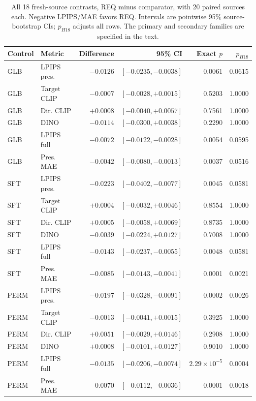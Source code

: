 \begin{table}[t]
\centering\small
\caption{All 18 fresh-source contrasts, REQ minus comparator, with 20 paired sources each. Negative LPIPS/MAE favors REQ. Intervals are pointwise 95\% source-bootstrap CIs; $p_{H18}$ adjusts all rows. The primary and secondary families are specified in the text.}
\label{tab:r87-all18}
\setlength{\tabcolsep}{4pt}
\begin{tabular}{llrrrr}
\toprule
Control & Metric & Difference & 95\% CI & Exact $p$ & $p_{H18}$\\
\midrule
GLB & LPIPS pres. & $-0.0126$ & $[-0.0235,-0.0038]$ & 0.0061 & 0.0615\\
GLB & Target CLIP & $-0.0007$ & $[-0.0028,+0.0015]$ & 0.5203 & 1.0000\\
GLB & Dir. CLIP & $+0.0008$ & $[-0.0040,+0.0057]$ & 0.7561 & 1.0000\\
GLB & DINO & $-0.0114$ & $[-0.0300,+0.0038]$ & 0.2290 & 1.0000\\
GLB & LPIPS full & $-0.0072$ & $[-0.0122,-0.0028]$ & 0.0054 & 0.0595\\
GLB & Pres. MAE & $-0.0042$ & $[-0.0080,-0.0013]$ & 0.0037 & 0.0516\\
\midrule
SFT & LPIPS pres. & $-0.0223$ & $[-0.0402,-0.0077]$ & 0.0045 & 0.0581\\
SFT & Target CLIP & $+0.0004$ & $[-0.0032,+0.0046]$ & 0.8554 & 1.0000\\
SFT & Dir. CLIP & $+0.0005$ & $[-0.0058,+0.0069]$ & 0.8735 & 1.0000\\
SFT & DINO & $-0.0039$ & $[-0.0224,+0.0127]$ & 0.7008 & 1.0000\\
SFT & LPIPS full & $-0.0143$ & $[-0.0237,-0.0055]$ & 0.0048 & 0.0581\\
SFT & Pres. MAE & $-0.0085$ & $[-0.0143,-0.0041]$ & 0.0001 & 0.0021\\
\midrule
PERM & LPIPS pres. & $-0.0197$ & $[-0.0328,-0.0091]$ & 0.0002 & 0.0026\\
PERM & Target CLIP & $-0.0013$ & $[-0.0041,+0.0015]$ & 0.3925 & 1.0000\\
PERM & Dir. CLIP & $+0.0051$ & $[-0.0029,+0.0146]$ & 0.2908 & 1.0000\\
PERM & DINO & $+0.0008$ & $[-0.0101,+0.0127]$ & 0.9010 & 1.0000\\
PERM & LPIPS full & $-0.0135$ & $[-0.0206,-0.0074]$ & $2.29\times10^{-5}$ & 0.0004\\
PERM & Pres. MAE & $-0.0070$ & $[-0.0112,-0.0036]$ & 0.0001 & 0.0018\\
\bottomrule
\end{tabular}
\end{table}

